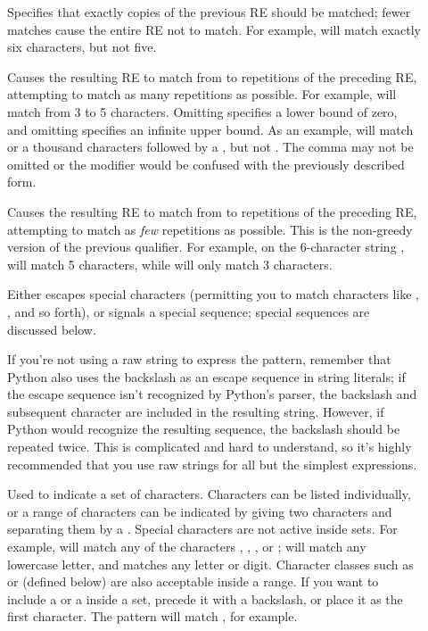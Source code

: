 \begin{description}
\item[]
Specifies that exactly  copies of the previous RE should be
matched; fewer matches cause the entire RE not to match.  For example,
 will match exactly six  characters, but
not five.

\item[] Causes the resulting RE to match from
 to  repetitions of the preceding RE, attempting to
match as many repetitions as possible.  For example, 
will match from 3 to 5  characters.  Omitting 
specifies a lower bound of zero, 
and omitting  specifies an infinite upper bound.  As an
example,  will match  or a thousand
 characters followed by a , but not .
The comma may not be omitted or the modifier would be confused with
the previously described form.

\item[] Causes the resulting RE to
match from  to  repetitions of the preceding RE,
attempting to match as \emph{few} repetitions as possible.  This is
the non-greedy version of the previous qualifier.  For example, on the
6-character string ,  will match 5
 characters, while  will only match 3
characters.

\item[\character{\e}] Either escapes special characters (permitting
you to match characters like \character{*}, , and so
forth), or signals a special sequence; special sequences are discussed
below.

If you're not using a raw string to
express the pattern, remember that Python also uses the
backslash as an escape sequence in string literals; if the escape
sequence isn't recognized by Python's parser, the backslash and
subsequent character are included in the resulting string.  However,
if Python would recognize the resulting sequence, the backslash should
be repeated twice.  This is complicated and hard to understand, so
it's highly recommended that you use raw strings for all but the
simplest expressions.

\item[\code{[]}] Used to indicate a set of characters.  Characters can
be listed individually, or a range of characters can be indicated by
giving two characters and separating them by a \character{-}.  Special
characters are not active inside sets.  For example, \regexp{[akm\$]}
will match any of the characters , ,
, or \character{\$}; \regexp{[a-z]}
will match any lowercase letter, and \code{[a-zA-Z0-9]} matches any
letter or digit.  Character classes such as  or 
(defined below) are also acceptable inside a range.  If you want to
include a \character{]} or a \character{-} inside a set, precede it with a
backslash, or place it as the first character.  The
pattern \regexp{[]]} will match \code{']'}, for example.


\end{description}
